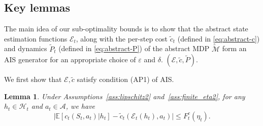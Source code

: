 \documentclass[letterpaper, 10pt]{IEEEtran}
\theoremstyle{plain}
\newtheorem{lemma}{Lemma}
\theoremstyle{nonumberplain}
\theoremstyle{plain}
\newcommand*\ALPHABET{\mathcal}
\newcommand*\ABSTRACT{\tilde}
\newcommand*\EXP{\mathds{E}}
\newcommand\EST{\mathcal{E}}
\begin{document}
\subsection{Key lemmas}
The main idea of our sub-optimality bounds is to show that the abstract state estimation functions $\EST_t$, along with the per-step cost $\ABSTRACT c_t$ (defined in \eqref{eq:abstract-c}) and dynamics $\ABSTRACT P_t$ (defined in \eqref{eq:abstract-P}) of the abstract MDP $\ABSTRACT {\ALPHABET M}$ form an AIS generator for an appropriate choice of $\varepsilon$ and $\delta$.
$(\EST, \ABSTRACT c, \ABSTRACT P)$.

We first show that $\EST, \ABSTRACT c$ satisfy condition (AP1) of AIS.

\begin{lemma}\label{lem:P1}
   Under Assumptions~\ref{ass:lipschitz2} and~\ref{ass:finite_eta2},  for any  $h_t \in \ALPHABET H_t$ and $a_t \in \ALPHABET A$, we have
   \[
   \bigl| \EXP[ c_t(S_t, a_t) | h_t ] -  \ABSTRACT c_t(\EST_t(h_t), a_t) \bigr| \le F^c_t(\eta_t).
   \]
\end{lemma}
\end{document}
